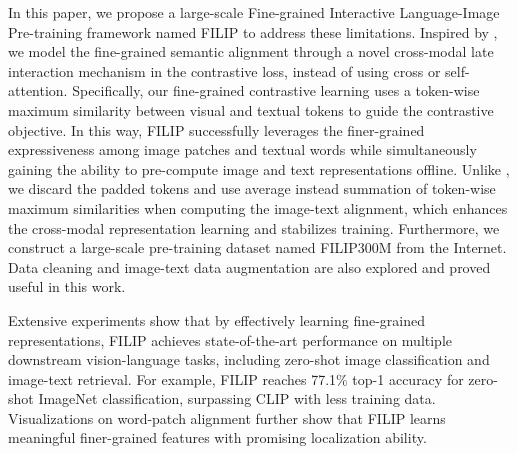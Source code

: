 In this paper, we propose a large-scale Fine-grained Interactive Language-Image Pre-training framework named FILIP 
to address these limitations.
Inspired by \cite{khattab2020colbert}, 
we model  the fine-grained semantic alignment  through a novel cross-modal
late interaction mechanism in the contrastive loss, instead of using cross or self-attention.
Specifically, our fine-grained contrastive learning uses a token-wise maximum similarity between visual  and textual tokens to guide the contrastive objective.
In this way,
FILIP  successfully leverages the finer-grained expressiveness
among image patches and textual words 
while simultaneously gaining the ability to pre-compute image and text representations offline.
Unlike \cite{khattab2020colbert}, we discard the padded tokens and use average 
instead summation 
of token-wise maximum similarities when computing the image-text alignment,
which enhances the cross-modal representation learning and stabilizes training.
Furthermore, we construct a large-scale pre-training dataset named FILIP300M from the Internet.
Data cleaning and image-text data augmentation are also explored  and proved useful in this work.

Extensive experiments show that by effectively learning fine-grained representations,
FILIP achieves state-of-the-art performance on multiple downstream vision-language tasks, including zero-shot image classification and image-text retrieval. For example, FILIP reaches  77.1\% top-1 accuracy for zero-shot ImageNet classification, surpassing  CLIP with less training data.
Visualizations on  word-patch alignment further show that FILIP learns meaningful finer-grained features with promising localization ability. 





